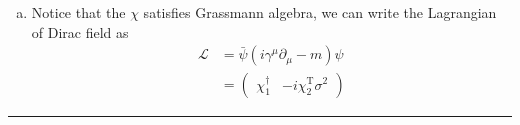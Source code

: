 \documentclass[12pt]{report}
\newcommand{\dd}{{\rm d}}
\numberwithin{problemname}{chapter}
\newenvironment{solution}{\vspace{1em}\par\noindent{\large\textbf{\textsc{Solution}}}\par}{\vspace{1em}\hrule}
\begin{document}
\begin{solution}
\begin{enumerate}[(a)]
\begin{align}
        S^*&=\int\dd^4 x\bigg[-i(\partial\chi^{\dagger})\cdot\bar{\sigma}\chi-\frac{im}{2}(\chi^{\dagger}\sigma^2\chi^*-\chi^{\text{T}}\sigma^2\chi)\bigg] \nonumber \\
        &=\int\dd^4 x\bigg[\chi^{\dagger}i\bar{\sigma}\cdot\partial\chi-i\partial(\chi^{\dagger}\bar{\sigma}\chi)+\frac{im}{2}(\chi^{\text{T}}\sigma^2\chi-\chi^{\dagger}\sigma^2\chi^*)\bigg] \nonumber \\
        &=S+\text{Surface Term} \ ,
    \end{align}
    therefore we have $S=S^*$ which indicates $S$ is real. \\
    Varying the $\chi^{\dagger}$, the variation of action is
    \begin{align}
        \delta S&=\int\dd^4 x\bigg\{(\delta\chi^{\dagger})i\bar{\sigma}\cdot\partial\chi-\frac{im}{2}\bigg[(\delta\chi^{\dagger})\sigma^2\chi^*+\chi^{\dagger}\sigma^2(\delta\chi^{\dagger})^{\text{T}}\bigg]\bigg\} \nonumber \\
        &=\int\dd^4 x\bigg\{(\delta\chi^{\dagger})i\bar{\sigma}\cdot\partial\chi-\frac{im}{2}\bigg[(\delta\chi^{\dagger})\sigma^2\chi^*+(\chi^{*})^{\text{T}}(-\sigma^2)^{\text{T}}(\delta\chi^{\dagger})^{\text{T}}\bigg]\bigg\} \nonumber \\
        &=\int\dd^4 x\bigg\{(\delta\chi^{\dagger})i\bar{\sigma}\cdot\partial\chi-\frac{im}{2}\bigg[(\delta\chi^{\dagger})\sigma^2\chi^*-[(\delta\chi^{\dagger})\sigma^2\chi^*]^{\text{T}}\bigg]\bigg\} \nonumber \\
        &=\int\dd^4 x\bigg\{(\delta\chi^{\dagger})i\bar{\sigma}\cdot\partial\chi-\frac{im}{2}\bigg[(\delta\chi^{\dagger})\sigma^2\chi^*+(\delta\chi^{\dagger})\sigma^2\chi^*)\bigg]\bigg\} \nonumber \\
        &=\int\dd^4 x(i\bar{\sigma}\cdot\partial\chi-im\sigma^2\chi^*)\delta\chi^{\dagger}\ ,
    \end{align}
    the $\delta S=0$ gives the Majorana equation
    \begin{align}
        i\bar{\sigma}\cdot\partial\chi-im\sigma^2\chi^*=0 \ .
    \end{align}
    \item Notice that the $\chi$ satisfies Grassmann algebra, we can write the Lagrangian of Dirac field as
    \begin{align}
        \mathcal{L}&=\bar{\psi}(i\gamma^{\mu}\partial_{\mu}-m)\psi \nonumber \\
        &=\begin{pmatrix}
          \chi_1^{\dagger} & -i\chi_2^{\text{T}}\sigma^2

\end{pmatrix}
\end{align}
\end{enumerate}
\end{solution}
\end{document}
